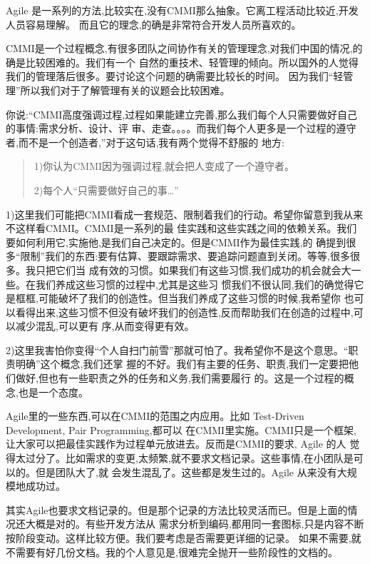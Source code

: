 \documentclass[11pt]{article}
\begin{document}
\begin{yang} 

\ylogo Agile 是一系列的方法,比较实在,没有CMMI那么抽象。它离工程活动比较近,开发人员容易理解。
而且它的理念,的确是非常符合开发人员所喜欢的。

CMMI是一个过程概念,有很多团队之间协作有关的管理理念,对我们中国的情况,的确是比较困难的。我们有一个
自然的重技术、轻管理的倾向。所以国外的人觉得我们的管理落后很多。要讨论这个问题的确需要比较长的时间。
因为我们``轻管理''所以我们对于了解管理有关的议题会比较困难。

你说:``CMMI高度强调过程,过程如果能建立完善,那么我们每个人只需要做好自己的事情:需求分析、设计、评
审、走查。。。。而我们每个人更多是一个过程的遵守者,而不是一个创造者,''对于这句话,我有两个觉得不舒服的
地方: 
\begin{quote}
1)你认为CMMI因为强调过程,就会把人变成了一个遵守者。

2)每个人``只需要做好自己的事\ldots ''
\end{quote}

1)这里我们可能把CMMI看成一套规范、限制着我们的行动。希望你留意到我从来不这样看CMMI。CMMI是一系列的最
佳实践和这些实践之间的依赖关系。我们要如何利用它,实施他,是我们自己决定的。但是CMMI作为最佳实践,的
确提到很多``限制''我们的东西:要有估算、要跟踪需求、要追踪问题直到关闭。等等,很多很多。我只把它们当
成有效的习惯。如果我们有这些习惯,我们成功的机会就会大一些。在我们养成这些习惯的过程中,尤其是这些习
惯我们不很认同,我们的确觉得它是框框,可能破坏了我们的创造性。但当我们养成了这些习惯的时候,我希望你
也可以看得出来,这些习惯不但没有破坏我们的创造性,反而帮助我们在创造的过程中,可以减少混乱,可以更有
序,从而变得更有效。

2)这里我害怕你变得``个人自扫门前雪''那就可怕了。我希望你不是这个意思。``职责明确''这个概念,我们还掌
握的不好。我们有主要的任务、职责,我们一定要把他们做好,但也有一些职责之外的任务和义务,我们需要履行
的。这是一个过程的概念,也是一个态度。

Agile里的一些东西,可以在CMMI的范围之内应用。比如 Test-Driven Development, Pair Programming,都可以
在CMMI里实施。CMMI只是一个框架,让大家可以把最佳实践作为过程单元放进去。反而是CMMI的要求, Agile 的人
觉得太过分了。比如需求的变更,太频繁,就不要求文档记录。这些事情,在小团队是可以的。但是团队大了,就
会发生混乱了。这些都是发生过的。Agile 从来没有大规模地成功过。

其实Agile也要求文档记录的。但是那个记录的方法比较灵活而已。但是上面的情况还大概是对的。有些开发方法从
需求分析到编码,都用同一套图标,只是内容不断按阶段变动。这样比较方便。我们要考虑是否需要更详细的记录。
如果不需要,就不需要有好几份文档。我的个人意见是,很难完全抛开一些阶段性的文档的。


\end{yang}
\end{document}
